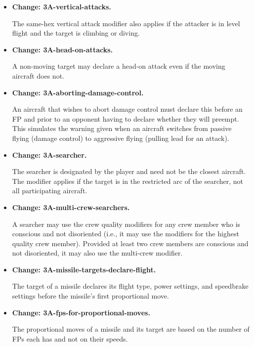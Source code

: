 \documentclass{report}
\newcommand{\changetag}[1]{\textbf{Change: #1.}\par}
\begin{document}
\begin{itemize}
        We also average the old DPs per game turn for supersonic rolls over two rolls.

    \item\changetag{3A-vertical-attacks}

        The  same-hex vertical attack modifier also applies if the attacker is in level flight and the target is climbing or diving.

    \item\changetag{3A-head-on-attacks}

        A non-moving target may declare a head-on attack even if the moving aircraft does not.

    \item\changetag{3A-aborting-damage-control}

        An aircraft that wishes to abort damage control must declare this before an FP and prior to an opponent having to declare whether they will preempt. This simulates the warning given when an aircraft switches from passive flying (damage control) to aggressive flying (pulling lead for an attack).

    \item\changetag{3A-searcher}

        The searcher is designated by the player and need not be the closest aircraft. The  modifier applies if the target is in the restricted arc of the searcher, not all participating aircraft.

    \item\changetag{3A-multi-crew-searchers}

        A searcher may use the crew quality modifiers for any crew member who is conscious and not disoriented (i.e., it may use the modifiers for the highest quality crew member). Provided at least two crew members are conscious and not disoriented, it may also use the multi-crew modifier.

    \item\changetag{3A-missile-targets-declare-flight}

        The target of a missile declares its flight type, power settings, and speedbrake settings before the missile's first proportional move.

    \item\changetag{3A-fps-for-proportional-moves}

        The proportional moves of a missile and its target are based on the number of FPs each has and not on their speeds.


\end{itemize}
\end{document}
